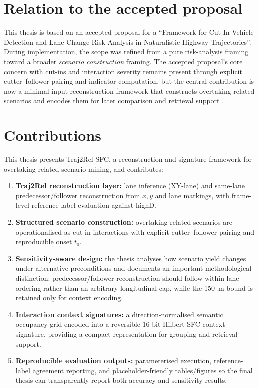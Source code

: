 \documentclass[12pt,a4paper,twoside,openright]{report}
\newcommand{\FrameworkName}{Traj2Rel-SFC}
\begin{document}
    \section{Relation to the accepted proposal}
    This thesis is based on an accepted proposal for a ``Framework for Cut-In Vehicle Detection and Lane-Change Risk Analysis in Naturalistic Highway Trajectories''. During implementation, the scope was refined from a pure risk-analysis framing toward a broader \emph{scenario construction} framing. The accepted proposal's core concern with cut-ins and interaction severity remains present through explicit cutter--follower pairing and indicator computation, but the central contribution is now a minimal-input reconstruction framework that constructs overtaking-related scenarios and encodes them for later comparison and retrieval support \cite{highd_2018,wang2021ssm}.

    \section{Contributions}
    This thesis presents \FrameworkName{}, a reconstruction-and-signature framework for overtaking-related scenario mining, and contributes:

    \begin{enumerate}[leftmargin=1.6em]
  \item \textbf{Traj2Rel reconstruction layer:} lane inference (XY-lane) and same-lane predecessor/follower reconstruction from $x,y$ and lane markings, with frame-level reference-label evaluation against highD.
  \item \textbf{Structured scenario construction:} overtaking-related scenarios are operationalised as cut-in interactions with explicit cutter--follower pairing and reproducible onset $t_0$.
  \item \textbf{Sensitivity-aware design:} the thesis analyses how scenario yield changes under alternative preconditions and documents an important methodological distinction: predecessor/follower reconstruction should follow within-lane ordering rather than an arbitrary longitudinal cap, while the \SI{150}{\meter} bound is retained only for context encoding.
  \item \textbf{Interaction context signatures:} a direction-normalised semantic occupancy grid encoded into a reversible 16-bit Hilbert SFC context signature, providing a compact representation for grouping and retrieval support.
  \item \textbf{Reproducible evaluation outputs:} parameterised execution, reference-label agreement reporting, and placeholder-friendly tables/figures so the final thesis can transparently report both accuracy and sensitivity results.
    \end{enumerate}
\end{document}

